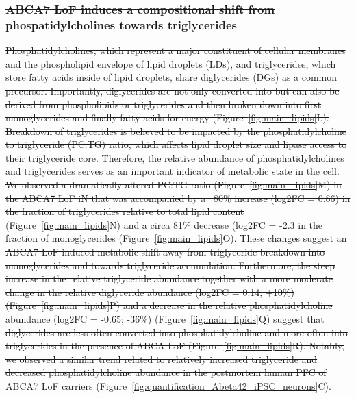 \subsubsection{\sout{ABCA7 LoF induces a compositional shift from phospatidylcholines towards triglycerides}}
\sout{Phosphatidylcholines, which represent a major constituent of cellular membranes and the phospholipid envelope of lipid droplets (LDs), and triglycerides, which store fatty acids inside of lipid droplets, share diglycerides (DGs) as a common precursor\cite{Tomioka2017-nv,Picataggi2022-yp}. Importantly, diglycerides are not only converted into but can also be derived from phospholipids or triglycerides and then broken down into first monoglycerides and finally fatty acids for energy (Figure~\ref{fig:main_lipids}L). Breakdown of triglycerides is believed to be impacted by the phosphatidylcholine to triglyceride (PC:TG) ratio, which affects lipid droplet size and lipase access to their triglyceride core\cite{Krahmer2011-xy,Guo2008-xt,Fei2011-bl,Schott2019-zq}. Therefore, the relative abundance of phosphatidylcholines and triglycerides serves as an important indicator of metabolic state in the cell. We observed a dramatically altered PC:TG ratio (Figure~\ref{fig:main_lipids}M) in the ABCA7 LoF iN that was accompanied by a ~80\% increase (log2FC = 0.86) in the fraction of triglycerides relative to total lipid content (Figure~\ref{fig:main_lipids}N) and a circa 81\% decrease (log2FC = -2.3 in the fraction of monoglycerides (Figure~\ref{fig:main_lipids}O). These changes suggest an ABCA7 LoF-induced metabolic shift away from triglyceride breakdown into monoglycerides and towards triglyceride accumulation. Furthermore, the steep increase in the relative triglyceride abundance together with a more moderate change in the relative diglyceride abundance (log2FC = 0.14; +10\%) (Figure~\ref{fig:main_lipids}P) and a decrease in the relative phosphatidylcholine abundance (log2FC = -0.65; -36\%) (Figure~\ref{fig:main_lipids}Q) suggest that diglycerides are less often converted into phosphatidylcholine and more often into triglycerides in the presence of ABCA LoF (Figure~\ref{fig:main_lipids}R). Notably, we observed a similar trend related to relatively increased triglyceride and decreased phosphatidylcholine abundance in the postmortem human PFC of ABCA7 LoF carriers (Figure~\ref{fig:quantification_Abeta42_iPSC_neurons}C).} 

